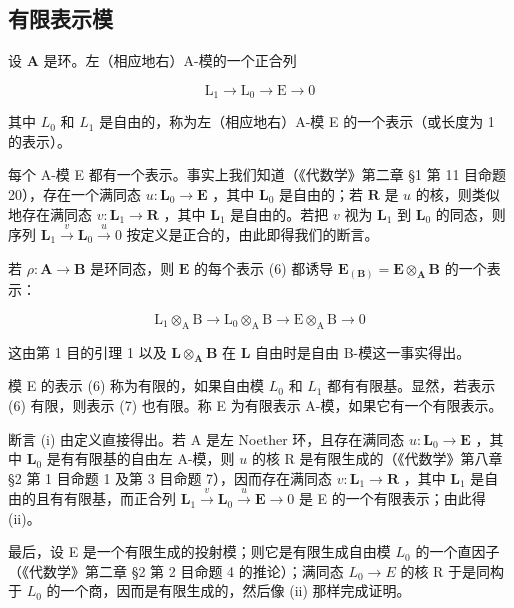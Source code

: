 \subsection{有限表示模}

设 \(\mathbf{A}\) 是环。左（相应地右）A-模的一个正合列

\[
\mathrm{L} _ {1} \rightarrow \mathrm{L} _ {0} \rightarrow \mathrm{E} \rightarrow 0\tag{6}
\]

其中 \(L_{0}\) 和 \(L_{1}\) 是自由的，称为左（相应地右）A-模 E 的一个表示（或长度为 1 的表示）。

每个 A-模 E 都有一个表示。事实上我们知道（《代数学》第二章 §1 第 11 目命题 20），存在一个满同态 \(u \colon \mathbf{L}_0 \to \mathbf{E}\) ，其中 \(\mathbf{L}_0\) 是自由的；若 \(\mathbf{R}\) 是 \(u\) 的核，则类似地存在满同态 \(v \colon \mathbf{L}_1 \to \mathbf{R}\) ，其中 \(\mathbf{L}_1\) 是自由的。若把 \(v\) 视为 \(\mathbf{L}_1\) 到 \(\mathbf{L}_0\) 的同态，则序列 \(\mathbf{L}_1 \xrightarrow{v} \mathbf{L}_0 \xrightarrow{u} 0\) 按定义是正合的，由此即得我们的断言。

若 \(\rho: \mathbf{A} \to \mathbf{B}\) 是环同态，则 \(\mathbf{E}\) 的每个表示 (6) 都诱导 \(\mathbf{E}_{(\mathbf{B})} = \mathbf{E} \otimes_{\mathbf{A}} \mathbf{B}\) 的一个表示：

\[
\mathrm{L} _ {1} \otimes_ {\mathrm{A}} \mathrm{B} \rightarrow \mathrm{L} _ {0} \otimes_ {\mathrm{A}} \mathrm{B} \rightarrow \mathrm{E} \otimes_ {\mathrm{A}} \mathrm{B} \rightarrow 0\tag{7}
\]

这由第 1 目的引理 1 以及 \(\mathbf{L} \otimes_{\mathbf{A}} \mathbf{B}\) 在 \(\mathbf{L}\) 自由时是自由 B-模这一事实得出。

模 E 的表示 (6) 称为有限的，如果自由模 \(L_{0}\) 和 \(L_{1}\) 都有有限基。显然，若表示 (6) 有限，则表示 (7) 也有限。称 E 为有限表示 A-模，如果它有一个有限表示。

断言 (i) 由定义直接得出。若 A 是左 Noether 环，且存在满同态 \(u \colon \mathbf{L}_0 \to \mathbf{E}\) ，其中 \(\mathbf{L}_0\) 是有有限基的自由左 A-模，则 \(u\) 的核 R 是有限生成的（《代数学》第八章 §2 第 1 目命题 1 及第 3 目命题 7），因而存在满同态 \(v \colon \mathbf{L}_1 \to \mathbf{R}\) ，其中 \(\mathbf{L}_1\) 是自由的且有有限基，而正合列 \(\mathbf{L}_1 \xrightarrow{v} \mathbf{L}_0 \xrightarrow{u} \mathbf{E} \to 0\) 是 E 的一个有限表示；由此得 (ii)。

最后，设 E 是一个有限生成的投射模；则它是有限生成自由模 \(L_{0}\) 的一个直因子（《代数学》第二章 §2 第 2 目命题 4 的推论）；满同态 \(L_{0} \rightarrow E\) 的核 R 于是同构于 \(L_{0}\) 的一个商，因而是有限生成的，然后像 (ii) 那样完成证明。

